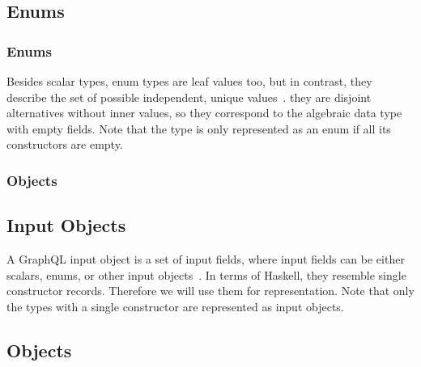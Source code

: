 \subsection{Enums}

\begin{frame}\frametitle{Enums}

Besides scalar types, enum types are leaf values too, but in contrast, they describe the set of possible independent, unique values~\cite{gql-spec}. they are disjoint alternatives without inner values, so they correspond to the algebraic data type with empty fields. Note that the type is only represented as an enum if all its constructors are empty.


\end{frame}

\begin{frame}\frametitle{Objects}

\subsection{Input Objects}

A GraphQL input object is a set of input fields, 
where input fields can be either 
scalars, enums, or other input objects~\cite{gql-spec}. 
In terms of Haskell, they resemble single constructor records. 
Therefore we will use them for representation.  Note that only the types with a single constructor are represented as input objects.


\subsection{Objects}

\end{frame}

